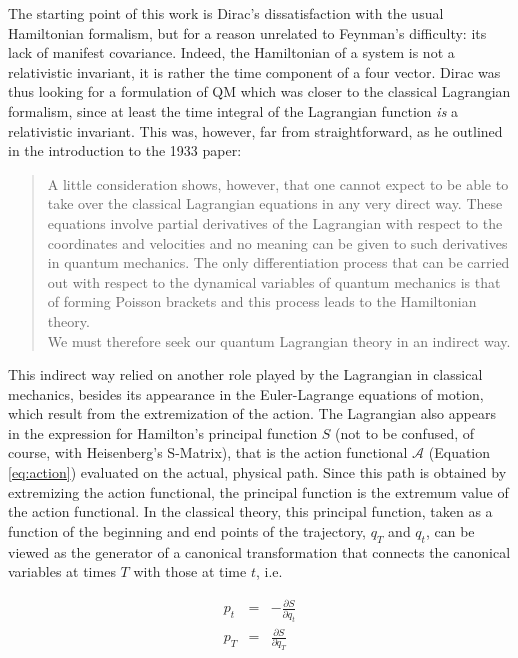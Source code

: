 \documentclass[12pt,a4paper]{article}
\begin{document}
The starting point of this work is Dirac's dissatisfaction with the usual Hamiltonian formalism, but for a reason unrelated to Feynman's difficulty: its lack of manifest covariance. Indeed, the Hamiltonian of a system is not a relativistic invariant, it is rather the time component of a four vector. Dirac was thus looking for a formulation of QM which was closer to the classical Lagrangian formalism, since at least the time integral of the Lagrangian function \emph{is} a relativistic invariant. This was, however, far from straightforward, as he outlined in the introduction to the 1933 paper:

\begin{quote}
A little consideration shows, however, that one cannot expect to be able to take over the classical Lagrangian equations in any very direct way. These equations involve partial derivatives of the Lagrangian with respect to the coordinates and velocities and no meaning can be given to such derivatives in quantum mechanics. The only differentiation process that can be carried out with respect to the dynamical variables of quantum mechanics is that of forming Poisson brackets and this process leads to the Hamiltonian theory.\\
We must therefore seek our quantum Lagrangian theory in an indirect way.
\end{quote}

This indirect way relied on another role played by the Lagrangian in classical mechanics, besides its appearance in the Euler-Lagrange equations of motion, which result from the extremization of the action. The Lagrangian also appears in the expression for Hamilton's principal function $S$ (not to be confused, of course, with Heisenberg's S-Matrix), that is the action functional $\mathcal{A}$ (Equation \ref{eq:action}) evaluated on the actual, physical path. Since this path is obtained by extremizing the action functional, the principal function is the extremum value of the action functional. In the classical theory, this principal function, taken as a function of the beginning and end points of the trajectory, $q_T$ and $q_t$, can be viewed as the generator of a canonical transformation that connects the canonical variables at times $T$ with those at time $t$, i.e.

\begin{eqnarray}\label{eq:canonical}
p_t & = & - \frac{\partial S}{\partial q_t} \nonumber\\
p_T & = & \frac{\partial S}{\partial q_T}
\end{eqnarray}
\end{document}
